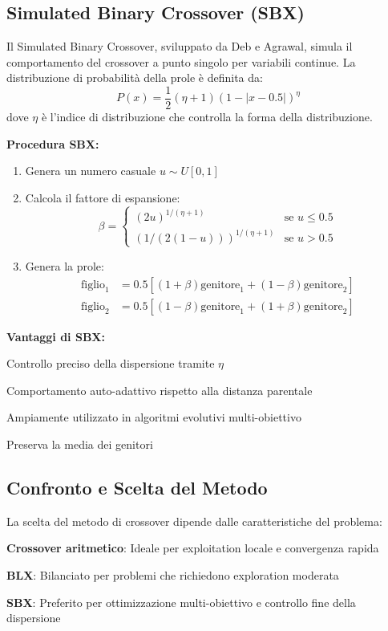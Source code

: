 \subsection{Simulated Binary Crossover (SBX)}
Il Simulated Binary Crossover, sviluppato da Deb e Agrawal, simula il comportamento del crossover a punto singolo per variabili continue. La distribuzione di probabilità della prole è definita da:
\[
P(x) = \frac{1}{2}(\eta + 1)(1 - |x - 0.5|)^\eta
\]
dove $\eta$ è l'indice di distribuzione che controlla la forma della distribuzione.

\textbf{Procedura SBX:}
\begin{enumerate}
\item Genera un numero casuale $u \sim U[0,1]$
\item Calcola il fattore di espansione:
\[
\beta = \begin{cases}
(2u)^{1/(\eta+1)} & \text{se } u \leq 0.5 \\
(1/(2(1-u)))^{1/(\eta+1)} & \text{se } u > 0.5
\end{cases}
\]
\item Genera la prole:
\[
\begin{aligned}
\text{figlio}_1 &= 0.5[(1+\beta)\text{genitore}_1 + (1-\beta)\text{genitore}_2] \\
\text{figlio}_2 &= 0.5[(1-\beta)\text{genitore}_1 + (1+\beta)\text{genitore}_2]
\end{aligned}
\]
\end{enumerate}

\textbf{Vantaggi di SBX:}
\begin{compactitemize}
\item Controllo preciso della dispersione tramite $\eta$
\item Comportamento auto-adattivo rispetto alla distanza parentale
\item Ampiamente utilizzato in algoritmi evolutivi multi-obiettivo
\item Preserva la media dei genitori
\end{compactitemize}

\subsection{Confronto e Scelta del Metodo}
La scelta del metodo di crossover dipende dalle caratteristiche del problema:
\begin{compactitemize}
\item \textbf{Crossover aritmetico}: Ideale per exploitation locale e convergenza rapida
\item \textbf{BLX}: Bilanciato per problemi che richiedono exploration moderata
\item \textbf{SBX}: Preferito per ottimizzazione multi-obiettivo e controllo fine della dispersione
\end{compactitemize}



